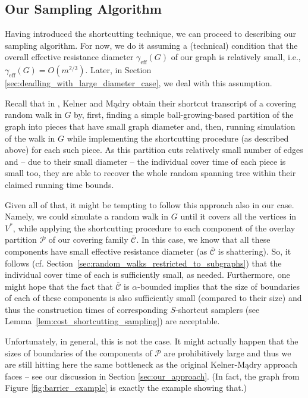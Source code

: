 \documentclass[11pt, letterpaper]{article}
\newcommand{\ocC}{\bar{\mathcal{C}}}
\newcommand{\cP}{\mathcal{P}}
\newcommand{\diameff}{\gamma_{\mathrm{eff}}}
\begin{document}
\subsection{Our Sampling Algorithm}

Having introduced the shortcutting technique, we can proceed to describing our sampling algorithm. For now, we do it assuming a (technical) condition that the overall effective resistance diameter $\diameff(G)$ of our graph is relatively small, i.e., $\diameff(G) = O(m^{2/3})$. Later, in Section \ref{sec:deadling_with_large_diameter_case}, we deal with this assumption. 

Recall that in \cite{KelnerM09}, Kelner and Mądry obtain their shortcut transcript of a covering random walk in $G$ by, first, finding a simple ball-growing-based partition of the graph into pieces that have small graph diameter and, then, running simulation of the walk in $G$ while implementing the shortcutting procedure (as described above) for each such piece. As this partition cuts relatively small number of edges and -- due to their small diameter -- the individual cover time of each piece is small too, they are able to recover the whole random spanning tree within their claimed running time bounds. 

Given all of that, it might be tempting to follow this approach also in our case. Namely, we could simulate a random walk in $G$ until it covers all the vertices in $V^*$, while applying the shortcutting procedure to each component of the overlay partition $\cP$ of our covering family $\ocC$. In this case, we know that all these components have small effective resistance diameter (as $\ocC$ is shattering). So, it follows (cf. Section~\ref{sec:random_walks_restricted_to_subgraphs}) that the individual cover time of each is sufficiently small, as needed. Furthermore, one might hope that the fact that $\ocC$ is $\alpha$-bounded implies that the size of boundaries of each of these components is also sufficiently small (compared to their size) and thus the construction times of corresponding $S$-shortcut samplers (see Lemma~\ref{lem:cost_shortcutting_sampling}) are acceptable. 

Unfortunately, in general, this is not the case. It might actually happen that the sizes of boundaries of the components of $\cP$ are prohibitively large and thus we are still hitting here the same bottleneck as the original Kelner-Mądry approach faces -- see our discussion in Section \ref{sec:our_approach}. (In fact, the graph from Figure \ref{fig:barrier_example} is exactly the example showing that.)
\end{document}
